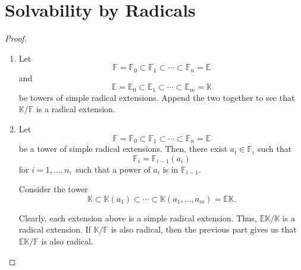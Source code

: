 \section{Solvability by Radicals}

\radextproperties*\label{prop:radextproperties2}
\begin{flushright}\hyperref[prop:radextproperties]{\upsym}\end{flushright}
\begin{proof}
    \phantom{hi}
    \begin{enumerate}[leftmargin=*]
        \item Let
        \begin{equation*} 
            \mathbb{F} = \mathbb{F}_0 \subset \mathbb{F}_1 \subset \cdots \subset \mathbb{F}_n = \mathbb{E}
        \end{equation*}
        and
        \begin{equation*} 
            \mathbb{E} = \mathbb{E}_0 \subset \mathbb{E}_1 \subset \cdots \subset \mathbb{E}_m = \mathbb{K}
        \end{equation*}
        be towers of simple radical extensions. Append the two together to see that $\mathbb{K}/\mathbb{F}$ is a radical extension.
        \item Let
        \begin{equation*} 
            \mathbb{F} = \mathbb{F}_0 \subset \mathbb{F}_1 \subset \cdots \subset \mathbb{F}_n = \mathbb{E}
        \end{equation*}
        be a tower of simple radical extensions. Then, there exist $a_i \in \mathbb{F}_i$ such that
        \begin{equation*} 
            \mathbb{F}_i = \mathbb{F}_{i - 1}(a_i)
        \end{equation*}
        for $i = 1, \ldots, n,$ such that a power of $a_i$ is in $\mathbb{F}_{i - 1}.$

        Consider the tower
        \begin{equation*} 
            \mathbb{K} \subset \mathbb{K}(a_1) \subset \cdots \subset \mathbb{K}(a_1, \ldots, a_m) = \mathbb{E}\mathbb{K}.
        \end{equation*}

        Clearly, each extension above is a simple radical extension. Thus, $\mathbb{E}\mathbb{K}/\mathbb{K}$ is a radical extension. If $\mathbb{K}/\mathbb{F}$ is also radical, then the previous part gives us that $\mathbb{E}\mathbb{K}/\mathbb{F}$ is also radical. \qedhere
    \end{enumerate}
\end{proof}

